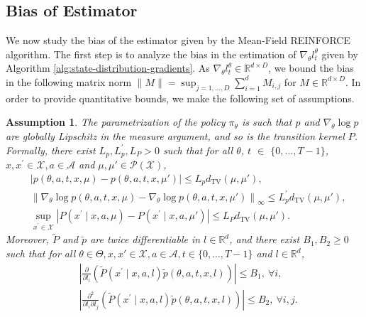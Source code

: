 \documentclass[11pt]{article}
\numberwithin{equation}{section}
\newtheorem{assumption}{Assumption}
\theoremstyle{definition}
\theoremstyle{remark}
\def\tv{\mathrm{TV}}
\def\cA{\mathcal{A}}
\def\cX{\mathcal{X}}
\def\R{{\mathbb R}}
\begin{document}
\subsection{Bias of Estimator}
\label{subsection:convergence-of-estimator}

We now study the bias of the estimator given by the Mean-Field REINFORCE algorithm.
The first step is to analyze the bias in the estimation of $\nabla_\theta l_t^\theta$ given by Algorithm \ref{alg:state-distribution-gradients}.
As $\nabla_\theta l_t^\theta \in \R^{d \times D}$, we bound the bias in the following matrix norm $\| M \| = \sup_{j = 1, \ldots, D} \sum_{i=1}^d M_{i,j}$ for $M \in \R^{d \times D}$. In order to provide quantitative bounds, we make the following set of assumptions.

\begin{assumption}
    \label{assumption:grad-log-policy}
    The parametrization of the policy $\pi_\theta$ is such that $p$ and $\nabla_\theta \log p$ are globally Lipschitz in the measure argument, and so is the transition kernel $P$. Formally, there exist $L_p, L^\prime_p,L_P > 0$ such that for all  $\theta$, $t$ $\in$ $\{0,\ldots,T-1\}$, $x,x^\prime \in \cX, a \in \cA$ and $\mu, \mu' \in \mathcal P(\cX)$, 
    \begin{equation}
        \begin{aligned}
            &\left| p(\theta, a, t,x, \mu) - p(\theta, a, t,x, \mu') \right| \leq L_p d_\tv(\mu, \mu'), \\
            &\left\| \nabla_\theta \log p(\theta, a, t,x, \mu) - \nabla_\theta \log p(\theta, a, t,x, \mu') \right\|_\infty \leq L^\prime_p d_\tv(\mu, \mu'), \\
            &\sup_{x^\prime \in \cX}\left| P(x^\prime \mid x, a, \mu) - P(x^\prime \mid x, a, \mu') \right| \leq L_P d_\tv(\mu, \mu').
        \end{aligned}
    \end{equation}
    Moreover, $\tilde P$ and $\tilde p$ are twice differentiable in $l \in \R^d$, and there exist $B_1, B_2 \geq 0$ such that 
    for all $\theta \in \Theta, x,x' \in \cX, a \in \cA, t \in \{0, \ldots, T-1\}$ and $l \in \R^d$,
    \[
    \begin{aligned}
        &\left|\frac{\partial }{\partial l_i} \left( \tilde P (x^\prime \mid x, a, l)\tilde p(\theta, a,t, x, l) \right)  \right|\leq B_1, \: \forall i, \\
        &\left|\frac{\partial ^2}{\partial l_i \partial l_j} \left( \tilde P (x^\prime \mid x, a, l)\tilde p(\theta, a,t, x, l) \right) \right| \leq B_2, \: \forall i,j.
    \end{aligned}
    \] 
\end{assumption}
\end{document}
